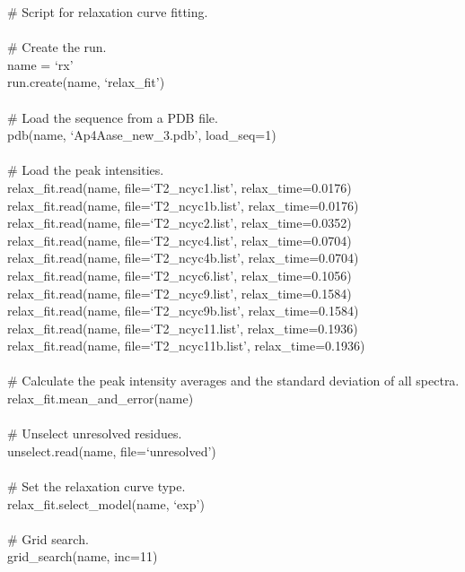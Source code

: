 \begin{exampleenv}
\# Script for relaxation curve fitting. \\
 \\
\# Create the run. \\
name = `rx' \\
run.create(name, `relax\_fit') \\
 \\
\# Load the sequence from a PDB file. \\
pdb(name, `Ap4Aase\_new\_3.pdb', load\_seq=1) \\
 \\
\# Load the peak intensities. \\
relax\_fit.read(name, file=`T2\_ncyc1.list', relax\_time=0.0176) \\
relax\_fit.read(name, file=`T2\_ncyc1b.list', relax\_time=0.0176) \\
relax\_fit.read(name, file=`T2\_ncyc2.list', relax\_time=0.0352) \\
relax\_fit.read(name, file=`T2\_ncyc4.list', relax\_time=0.0704) \\
relax\_fit.read(name, file=`T2\_ncyc4b.list', relax\_time=0.0704) \\
relax\_fit.read(name, file=`T2\_ncyc6.list', relax\_time=0.1056) \\
relax\_fit.read(name, file=`T2\_ncyc9.list', relax\_time=0.1584) \\
relax\_fit.read(name, file=`T2\_ncyc9b.list', relax\_time=0.1584) \\
relax\_fit.read(name, file=`T2\_ncyc11.list', relax\_time=0.1936) \\
relax\_fit.read(name, file=`T2\_ncyc11b.list', relax\_time=0.1936) \\
 \\
\# Calculate the peak intensity averages and the standard deviation of all spectra. \\
relax\_fit.mean\_and\_error(name) \\
 \\
\# Unselect unresolved residues. \\
unselect.read(name, file=`unresolved') \\
 \\
\# Set the relaxation curve type. \\
relax\_fit.select\_model(name, `exp') \\
 \\
\# Grid search. \\
grid\_search(name, inc=11) \\

\end{exampleenv}

